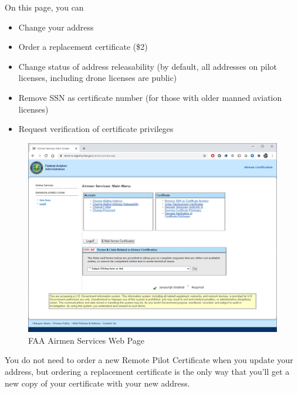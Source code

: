 \documentclass[
]{book}
\providecommand{\tightlist}{%
  \setlength{\itemsep}{0pt}\setlength{\parskip}{0pt}}
\begin{document}
On this page, you can

\begin{itemize}
\tightlist
\item
  Change your address
\item
  Order a replacement certificate (\$2)
\item
  Change status of address releasability (by default, all addresses on pilot licenses, including drone licenses are public)
\item
  Remove SSN as certificate number (for those with older manned aviation licenses)
\item
  Request verification of certificate privileges
\end{itemize}

\begin{figure}

{\centering \includegraphics[width=0.7\linewidth]{images/airmen-services} 

}

\caption{FAA Airmen Services Web Page}\label{fig:airmen-services}
\end{figure}

You do not need to order a new Remote Pilot Certificate when you update your address, but ordering a replacement certificate is the only way that you'll get a new copy of your certificate with your new address.
\end{document}
